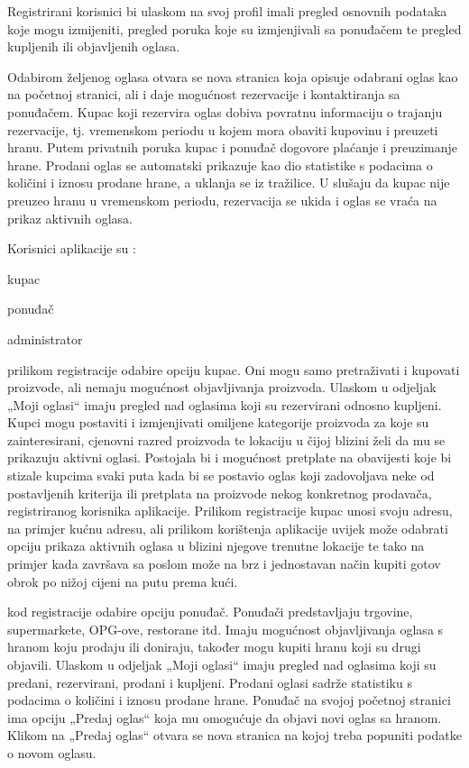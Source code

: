 	Registrirani korisnici bi ulaskom na svoj profil imali pregled osnovnih podataka koje mogu izmijeniti, pregled poruka koje su izmjenjivali sa ponuđačem te pregled kupljenih ili objavljenih oglasa. 
	
	Odabirom željenog oglasa otvara se nova stranica koja opisuje odabrani oglas kao na početnoj stranici, ali i daje mogućnost rezervacije i kontaktiranja sa ponuđačem. Kupac koji rezervira oglas dobiva povratnu informaciju o trajanju rezervacije, tj. vremenskom periodu u kojem mora obaviti kupovinu i preuzeti hranu. Putem privatnih poruka kupac i ponuđač dogovore plaćanje i preuzimanje hrane. Prodani oglas se automatski prikazuje kao dio statistike s podacima o količini i iznosu prodane hrane, a uklanja se iz tražilice. U slušaju da kupac nije preuzeo hranu u vremenskom periodu, rezervacija se ukida i oglas se vraća na prikaz aktivnih oglasa. 
	
	 
	
	
\noindent Korisnici aplikacije su : 
	
	\begin{packed_item}
		
		\item  kupac
		\item  ponuđač 
		\item  administrator
		
	\end{packed_item}

\textit{} prilikom registracije odabire opciju kupac. Oni mogu samo pretraživati i kupovati proizvode, ali nemaju mogućnost objavljivanja proizvoda. Ulaskom u odjeljak „Moji oglasi“  imaju pregled nad oglasima koji su rezervirani odnosno kupljeni. Kupci mogu postaviti i izmjenjivati omiljene kategorije proizvoda za koje su zainteresirani, cjenovni razred proizvoda te lokaciju u čijoj blizini želi da mu se prikazuju aktivni oglasi. Postojala bi i mogućnost pretplate na obavijesti koje bi stizale kupcima svaki puta kada bi se postavio oglas koji zadovoljava neke od postavljenih kriterija ili pretplata na proizvode nekog konkretnog prodavača, registriranog korisnika aplikacije. Prilikom registracije kupac unosi svoju adresu, na primjer kućnu adresu, ali prilikom korištenja aplikacije uvijek može odabrati opciju prikaza aktivnih oglasa u blizini njegove trenutne lokacije te tako na primjer kada završava sa poslom može na brz i jednostavan način kupiti gotov obrok po nižoj cijeni na putu prema kući. 

	\textit{} kod registracije odabire opciju ponuđač. Ponuđači predstavljaju trgovine, supermarkete, OPG-ove, restorane itd. Imaju mogućnost objavljivanja oglasa s hranom koju prodaju ili doniraju, također mogu kupiti hranu koji su drugi objavili. Ulaskom u odjeljak „Moji oglasi“  imaju pregled nad oglasima koji su predani, rezervirani, prodani i kupljeni. Prodani oglasi sadrže statistiku s podacima o količini i iznosu prodane hrane. Ponuđač na svojoj početnoj stranici ima opciju „Predaj oglas“ koja mu omogućuje da objavi novi oglas sa hranom. Klikom na „Predaj oglas“ otvara se nova stranica na kojoj treba popuniti podatke o novom oglasu.  

